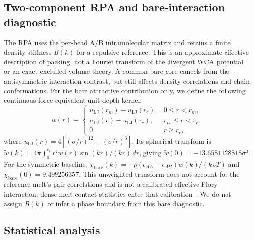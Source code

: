 \documentclass[pdflatex,sn-nature,onecolumn]{sn-jnl}
\begin{document}
\subsection{Two-component RPA and bare-interaction diagnostic}

The RPA uses the per-bead A/B intramolecular matrix and retains a finite density stiffness $B(k)$ for a repulsive reference. This is an approximate effective description of packing, not a Fourier transform of the divergent WCA potential or an exact excluded-volume theory. A common bare core cancels from the antisymmetric interaction contrast, but still affects density correlations and chain conformations. For the bare attractive contribution only, we define the following continuous force-equivalent unit-depth kernel:
\begin{equation}
w(r)=\begin{cases}
u_{\mathrm{LJ}}(r_m)-u_{\mathrm{LJ}}(r_c), & 0\le r<r_m,\\
u_{\mathrm{LJ}}(r)-u_{\mathrm{LJ}}(r_c), & r_m\le r<r_c,\\
0,&r\ge r_c,
\end{cases}
\end{equation}
where $u_{\mathrm{LJ}}(r)=4[(\sigma/r)^{12}-(\sigma/r)^6]$. Its spherical transform is $\widetilde w(k)=4\pi\int_0^{r_c}r^2w(r)\sin(kr)/(kr)\,dr$, giving $\widetilde w(0)=-13.6581128818\sigma^3$. For the symmetric baseline, $\chi_{\mathrm{bare}}(k)=-\rho(\epsilon_{AA}-\epsilon_{AB})\widetilde w(k)/(k_BT)$ and $\chi_{\mathrm{bare}}(0)=9.499256357$. This unweighted transform does not account for the reference melt's pair correlations and is not a calibrated effective Flory interaction; dense-melt contact statistics enter that calibration~\cite{MorseChung2009}. We do not assign $B(k)$ or infer a phase boundary from this bare diagnostic.

\subsection{Statistical analysis}
\end{document}
